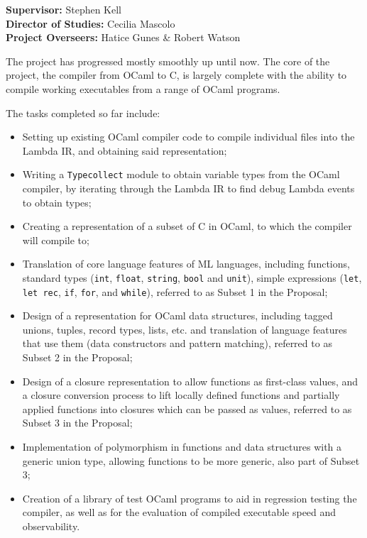 \maketitle

\textbf{Supervisor:} Stephen Kell\\
\textbf{Director of Studies:} Cecilia Mascolo\\
\textbf{Project Overseers:} Hatice Gunes \& Robert Watson

The project has progressed mostly smoothly up until now. The core of the 
project, the compiler from OCaml to C, is largely complete with the ability to 
compile working executables from a range of OCaml programs.

The tasks completed so far include:
\begin{itemize}
    \item Setting up existing OCaml compiler code to compile individual files 
    into the Lambda IR, and obtaining said representation;
    \item Writing a \texttt{Typecollect} module to obtain variable types from 
    the OCaml compiler, by iterating through the Lambda IR to find debug Lambda 
    events to obtain types;
    \item Creating a representation of a subset of C in OCaml, to which the 
    compiler will compile to;
    \item Translation of core language features of ML languages, including 
    functions, standard types (\texttt{int}, \texttt{float}, \texttt{string}, 
    \texttt{bool} and \texttt{unit}), simple expressions (\texttt{let}, 
    \texttt{let rec}, \texttt{if}, \texttt{for}, and \texttt{while}), referred 
    to as Subset 1 in the Proposal;
    \item Design of a representation for OCaml data structures, including 
    tagged unions, tuples, record types, lists, etc. and translation of 
    language features that use them (data constructors and pattern matching), 
    referred to as Subset 2 in the Proposal;
    \item Design of a closure representation to allow functions as first-class 
    values, and a closure conversion process to lift locally defined functions 
    and partially applied functions into closures which can be passed as 
    values, referred to as Subset 3 in the Proposal;
    \item Implementation of polymorphism in functions and data structures with 
    a generic union type, allowing functions to be more generic, also part of 
    Subset 3;
    \item Creation of a library of test OCaml programs to aid in regression 
    testing the compiler, as well as for the evaluation of compiled executable 
    speed and observability.
\end{itemize}

